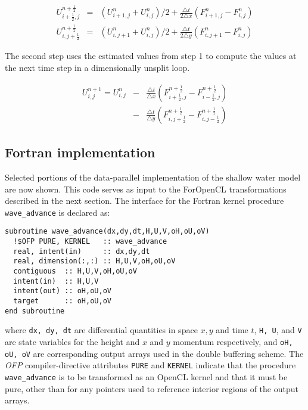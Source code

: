 \begin{eqnarray*}
U_{i+\frac{1}{2},j}^{n+\frac{1}{2}} & = & (U_{i+1,j}^{n}+U_{i,j}^{n})/2+\frac{\triangle t}{2\triangle x}\left(F_{i+1,j}^{n}-F_{i,j}^{n}\right)\\
U_{i,j+\frac{1}{2}}^{n+\frac{1}{2}} & = & (U_{i,j+1}^{n}+U_{i,j}^{n})/2+\frac{\triangle t}{2\triangle y}\left(F_{i,j+1}^{n}-F_{i,j}^{n}\right)
\end{eqnarray*}


The second step uses the estimated values from step 1 to compute the
values at the next time step in a dimensionally unsplit loop.

\begin{eqnarray*}
U_{i,j}^{n+1} = U_{i,j}^{n} &-&\frac{\triangle t}{\triangle
  x}(F_{i+\frac{1}{2},j}^{n+\frac{1}{2}}-F_{i-\frac{1}{2},j}^{n+\frac{1}{2}})\\
&-& \frac{\triangle
  t}{\triangle
  y}(F_{i,j+\frac{1}{2}}^{n+\frac{1}{2}}-F_{i,j-\frac{1}{2}}^{n+\frac{1}{2}})
\end{eqnarray*}


\subsection{Fortran implementation}

Selected portions of the data-parallel implementation of the shallow water model
are now shown.  This code serves as input to the ForOpenCL transformations
described in the next section.  The interface for the Fortran kernel procedure {\tt
  wave\_advance} is declared as:

{\small
\begin{verbatim}
subroutine wave_advance(dx,dy,dt,H,U,V,oH,oU,oV)
  !$OFP PURE, KERNEL   :: wave_advance
  real, intent(in)     :: dx,dy,dt
  real, dimension(:,:) :: H,U,V,oH,oU,oV
  contiguous  :: H,U,V,oH,oU,oV
  intent(in)  :: H,U,V
  intent(out) :: oH,oU,oV
  target      :: oH,oU,oV
end subroutine
\end{verbatim}
}

\noindent
where {\tt dx, dy, dt} are differential quantities in space $x, y$ and time $t$,
{\tt H, U}, and {\tt V} are state variables for the height and $x$ and $y$
momentum respectively, and {\tt oH, oU, oV} are corresponding output arrays used
in the double buffering scheme.  The \emph{OFP} compiler-directive attributes
{\tt PURE} and {\tt KERNEL} indicate that the procedure {\tt wave\_advance} is
to be transformed as an OpenCL kernel and that it must be pure, other than for any
pointers used to reference interior regions of the output arrays.

